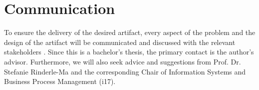 \section{Communication}
To ensure the delivery of the desired artifact, every aspect of the problem and the design of the artifact will be communicated and discussed with the relevant stakeholders \cite{DSM_3}. Since this is a bachelor's thesis, the primary contact is the author's advisor. Furthermore, we will also seek advice and suggestions from Prof. Dr. Stefanie Rinderle-Ma and the corresponding Chair of Information Systems and Business Process Management (i17).






